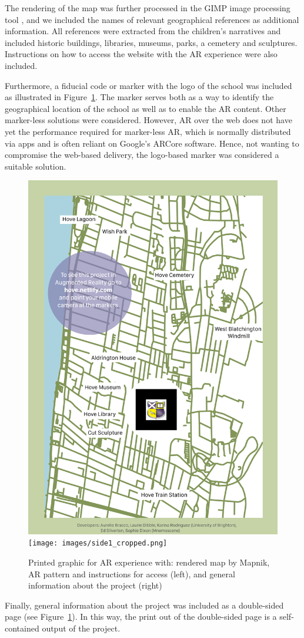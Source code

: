 \documentclass[acmlarge,screen,dvipsnames]{acmart}
\begin{document}
The rendering of the map was further processed in the GIMP image processing
tool \cite{gimp}, and we included the names of relevant
geographical references as additional information. All references were extracted from the children's
narratives and included historic buildings, libraries, museums, parks,
a cemetery and sculptures. Instructions on how to access the website with the AR
experience were also included.

Furthermore, a fiducial code or marker with the logo of the school was
included as illustrated in Figure~\ref{fig:print}. The marker serves both as a
way to identify the geographical location of the school as well as to enable
the AR content. Other marker-less solutions were considered. However, AR over
the web does not have yet the performance required for marker-less AR, which
is normally distributed via apps and is often reliant on Google's ARCore
software. Hence, not wanting to compromise the web-based delivery, the
logo-based marker was considered a suitable solution.


\begin{figure}[h] \centering
\includegraphics[width=0.49\linewidth]{images/side.png}
\texttt{[image: images/side1\_cropped.png]}
\caption{Printed graphic for AR experience with: rendered map by
Mapnik, AR pattern and instructions for access (left), and general information
about the project (right)} \label{fig:print} \end{figure}


Finally, general information about the project was included as a
double-sided page (see Figure~\ref{fig:print}). In this way, the print out of the double-sided
page is a self-contained output of the project.
\end{document}

